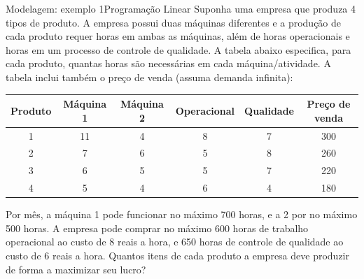 \documentclass[t]{beamer}
\begin{document}
\begin{ftst}{Modelagem: exemplo 1}{Programação Linear}
\footnotesize
Suponha uma empresa que produza 4 tipos de produto. A empresa possui duas máquinas diferentes e a produção de cada produto requer horas em ambas as máquinas, além de horas operacionais e horas em um processo de controle de qualidade. A tabela abaixo especifica, para cada produto, quantas horas são necessárias em cada máquina/atividade. A tabela inclui também o preço de venda (assuma demanda infinita):

\begin{table}[]
\centering
\footnotesize
\begin{tabular}{|c|c|c|c|c|c|}
\hline
Produto & Máquina 1 & Máquina 2 & Operacional & Qualidade & Preço de venda \\ \hline
1       & 11        & 4         & 8           & 7         & 300            \\ \hline
2       & 7         & 6         & 5           & 8         & 260            \\ \hline
3       & 6         & 5         & 5           & 7         & 220            \\ \hline
4       & 5         & 4         & 6           & 4         & 180            \\ \hline
\end{tabular}
\end{table}

Por mês, a máquina 1 pode funcionar no máximo 700 horas, e a 2 por no máximo 500 horas. A empresa pode comprar no máximo 600 horas de trabalho operacional ao custo de 8 reais a hora, e 650 horas de controle de qualidade ao custo de 6 reais a hora. Quantos itens de cada produto a empresa deve produzir de forma a maximizar seu lucro?
\end{ftst}

\end{document}
